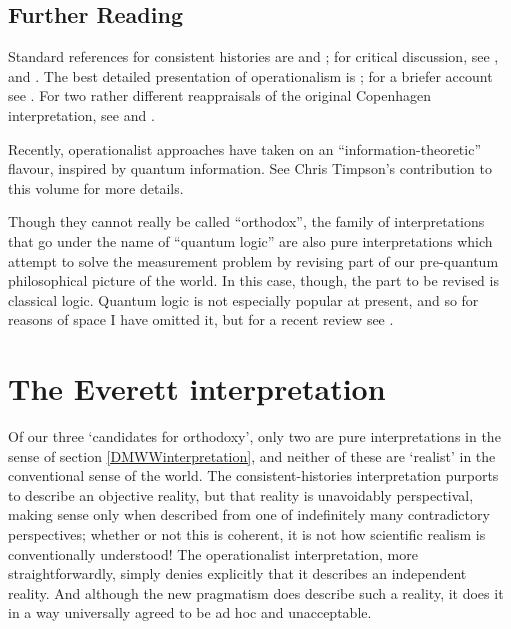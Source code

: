 \documentclass[12pt]{article}
\begin{document}
\subsection{Further Reading}

Standard references for consistent histories are  and ; for critical discussion, see ,  and . The best detailed presentation of operationalism is ; for a briefer account see . For two rather different reappraisals of the original Copenhagen interpretation, see  and .

Recently, operationalist approaches have taken on an ``information-theoretic'' flavour, inspired by quantum information. See Chris Timpson's contribution to this volume for more details. 

Though they cannot really be called ``orthodox'', the family of interpretations that go under the name of ``quantum logic'' are also pure interpretations which attempt to solve the measurement problem by revising part of our pre-quantum philosophical picture of the world. In this case, though, the part to be revised is classical logic. Quantum logic is not especially popular at present, and so for reasons of space I have omitted it, but for a recent review see .



\section{The Everett interpretation}\label{DMWWeverett}

Of our three `candidates for orthodoxy', only two are pure interpretations in the sense of section \ref{DMWWinterpretation}, and neither of these are `realist' in the conventional sense of the world. The consistent-histories interpretation purports to describe an objective reality, but that reality is unavoidably perspectival, making sense only when described from one of indefinitely many contradictory perspectives; whether or not this is coherent, it is not how scientific realism is conventionally understood! The operationalist interpretation, more straightforwardly, simply denies explicitly that it describes an independent reality. And although the new pragmatism does describe such a reality, it does it in a way universally agreed to be ad hoc and unacceptable.
\end{document}

